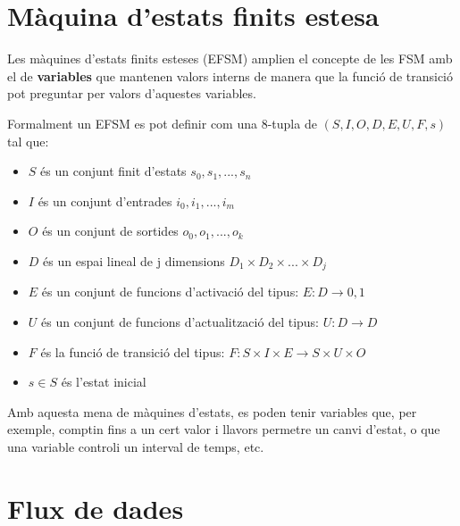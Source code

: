 \section{Màquina d'estats finits estesa}
\label{sec:EFSM}

Les màquines d'estats finits esteses (\gls{EFSM}) amplien el concepte de les FSM amb el de {\bf variables} que mantenen valors interns de manera que la funció de transició pot preguntar per valors d'aquestes variables.\cite{wiki:EFSM}

\begin{remark}
 Formalment un EFSM es pot definir com una 8-tupla de $(S, I, O, D, E, U, F, s)$ tal que:
\begin{itemize}
 \item $S$ és un conjunt finit d'estats ${s_0,s_1, ..., s_n}$
 \item $I$ és un conjunt d'entrades ${i_0, i_1, ..., i_m}$
 \item $O$ és un conjunt de sortides ${o_0, o_1, ..., o_k}$
 \item $D$ és un espai lineal de j dimensions $D_1 \times D_2 \times ... \times D_j$
 \item $E$ és un conjunt de funcions d'activació del tipus: $E: D \to {0, 1}$
 \item $U$ és un conjunt  de funcions d'actualització del tipus: $U: D \to D$
 \item $F$ és la funció de transició del tipus: $F: S \times I \times E \to S \times U \times O$
 \item $s \in S$ és l'estat inicial 
\end{itemize}
\end{remark}

Amb aquesta mena de màquines d'estats, es poden tenir variables que, per exemple, comptin fins a un cert valor i llavors permetre un canvi d'estat, o que una variable controli un interval de temps, etc. 


\section{Flux de dades}
\label{sec:dataflow}






